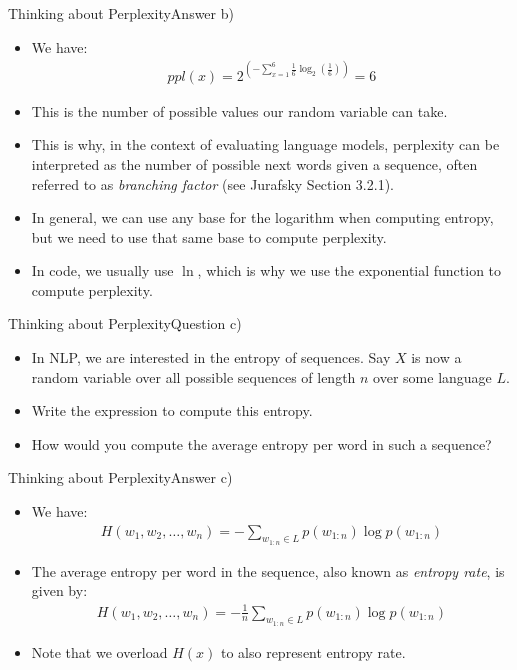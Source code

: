 \documentclass[t]{beamer}
\begin{document}
\begin{frame}{Thinking about Perplexity}{Answer b)}
    \begin{itemize}
        \item We have:
              \begin{align*}
                  ppl(x) = 2^{\left(-\sum_{x=1}^6 \frac{1}{6}\log_2\left(\frac{1}{6}\right)\right)} = 6
              \end{align*}
        \item This is the number of possible values our random variable can
              take.
        \item This is why, in the context of evaluating language models,
              perplexity can be interpreted as the number of possible next words
              given a sequence, often referred to as \emph{branching factor}
              (see Jurafsky Section 3.2.1).
        \item In general, we can use any base for the logarithm when
              computing entropy, but we need to use that same base to compute
              perplexity.
        \item In code, we usually use $\ln$, which is why we use the exponential
              function to compute perplexity.
    \end{itemize}
\end{frame}

\begin{frame}{Thinking about Perplexity}{Question c)}
    \begin{itemize}
        \item In NLP, we are interested in the entropy of sequences.
              Say $X$ is now a random variable over all possible sequences of
              length $n$ over some language $L$.
        \item Write the expression to compute this entropy.
        \item How would you compute the average entropy per word in such a
              sequence?
    \end{itemize}
\end{frame}

\begin{frame}{Thinking about Perplexity}{Answer c)}
    \begin{itemize}
        \item We have:
              \begin{align*}
                  H(w_1,w_2,\ldots,w_n) = -\sum_{w_{1:n}\in L} p(w_{1:n})\log p(w_{1:n})
              \end{align*}
        \item The average entropy per word in the sequence, also known as
              \emph{entropy rate}, is given by:
              \begin{align*}
                  H(w_1,w_2,\ldots,w_n) = -\frac{1}{n}\sum_{w_{1:n}\in L} p(w_{1:n})\log p(w_{1:n})
              \end{align*}
        \item Note that we overload $H(x)$ to also represent entropy rate.
    \end{itemize}
\end{frame}
\end{document}
